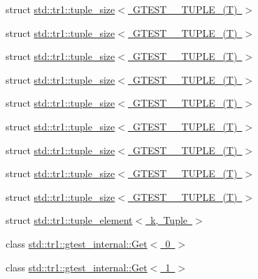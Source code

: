 \begin{DoxyCompactItemize}
\item 
struct \mbox{\hyperlink{structstd_1_1tr1_1_1tuple__size_3_01_g_t_e_s_t__2___t_u_p_l_e___07_t_08_01_4}{std\+::tr1\+::tuple\+\_\+size$<$ G\+T\+E\+S\+T\+\_\+\_\+\+T\+U\+P\+L\+E\+\_\+(\+T) $>$}}
\item 
struct \mbox{\hyperlink{structstd_1_1tr1_1_1tuple__size_3_01_g_t_e_s_t__3___t_u_p_l_e___07_t_08_01_4}{std\+::tr1\+::tuple\+\_\+size$<$ G\+T\+E\+S\+T\+\_\+\_\+\+T\+U\+P\+L\+E\+\_\+(\+T) $>$}}
\item 
struct \mbox{\hyperlink{structstd_1_1tr1_1_1tuple__size_3_01_g_t_e_s_t__4___t_u_p_l_e___07_t_08_01_4}{std\+::tr1\+::tuple\+\_\+size$<$ G\+T\+E\+S\+T\+\_\+\_\+\+T\+U\+P\+L\+E\+\_\+(\+T) $>$}}
\item 
struct \mbox{\hyperlink{structstd_1_1tr1_1_1tuple__size_3_01_g_t_e_s_t__5___t_u_p_l_e___07_t_08_01_4}{std\+::tr1\+::tuple\+\_\+size$<$ G\+T\+E\+S\+T\+\_\+\_\+\+T\+U\+P\+L\+E\+\_\+(\+T) $>$}}
\item 
struct \mbox{\hyperlink{structstd_1_1tr1_1_1tuple__size_3_01_g_t_e_s_t__6___t_u_p_l_e___07_t_08_01_4}{std\+::tr1\+::tuple\+\_\+size$<$ G\+T\+E\+S\+T\+\_\+\_\+\+T\+U\+P\+L\+E\+\_\+(\+T) $>$}}
\item 
struct \mbox{\hyperlink{structstd_1_1tr1_1_1tuple__size_3_01_g_t_e_s_t__7___t_u_p_l_e___07_t_08_01_4}{std\+::tr1\+::tuple\+\_\+size$<$ G\+T\+E\+S\+T\+\_\+\_\+\+T\+U\+P\+L\+E\+\_\+(\+T) $>$}}
\item 
struct \mbox{\hyperlink{structstd_1_1tr1_1_1tuple__size_3_01_g_t_e_s_t__8___t_u_p_l_e___07_t_08_01_4}{std\+::tr1\+::tuple\+\_\+size$<$ G\+T\+E\+S\+T\+\_\+\_\+\+T\+U\+P\+L\+E\+\_\+(\+T) $>$}}
\item 
struct \mbox{\hyperlink{structstd_1_1tr1_1_1tuple__size_3_01_g_t_e_s_t__9___t_u_p_l_e___07_t_08_01_4}{std\+::tr1\+::tuple\+\_\+size$<$ G\+T\+E\+S\+T\+\_\+\_\+\+T\+U\+P\+L\+E\+\_\+(\+T) $>$}}
\item 
struct \mbox{\hyperlink{structstd_1_1tr1_1_1tuple__size_3_01_g_t_e_s_t__10___t_u_p_l_e___07_t_08_01_4}{std\+::tr1\+::tuple\+\_\+size$<$ G\+T\+E\+S\+T\+\_\+\_\+\+T\+U\+P\+L\+E\+\_\+(\+T) $>$}}
\item 
struct \mbox{\hyperlink{structstd_1_1tr1_1_1tuple__element}{std\+::tr1\+::tuple\+\_\+element$<$ k, Tuple $>$}}
\item 
class \mbox{\hyperlink{classstd_1_1tr1_1_1gtest__internal_1_1_get_3_010_01_4}{std\+::tr1\+::gtest\+\_\+internal\+::\+Get$<$ 0 $>$}}
\item 
class \mbox{\hyperlink{classstd_1_1tr1_1_1gtest__internal_1_1_get_3_011_01_4}{std\+::tr1\+::gtest\+\_\+internal\+::\+Get$<$ 1 $>$}}

\end{DoxyCompactItemize}
